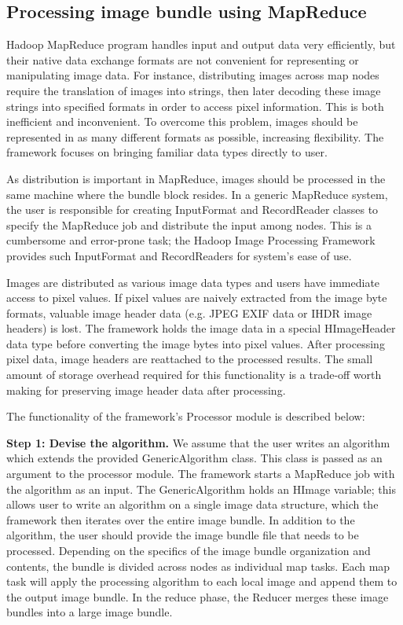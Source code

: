 \documentclass[conference]{IEEEtran}
\begin{document}
\subsection{Processing image bundle using MapReduce}
Hadoop MapReduce program handles input and output data very
efficiently, but their native data exchange formats are not convenient
for representing or manipulating image data.  For instance,
distributing images across map nodes require the translation of images
into strings, then later decoding these image strings into specified
formats in order to access pixel information.  This is both
inefficient and inconvenient. To overcome this problem, images should
be represented in as many different formats as possible, increasing
flexibility. The framework focuses on bringing familiar data types
directly to user.

As distribution is important in MapReduce, images should be processed
in the same machine where the bundle block resides. In a generic
MapReduce system, the user is responsible for creating InputFormat and
RecordReader classes to specify the MapReduce job and distribute the
input among nodes. This is a cumbersome and error-prone task; the
Hadoop Image Processing Framework provides such InputFormat and
RecordReaders for system's ease of use.

Images are distributed as various image data types and users have
immediate access to pixel values.  If pixel values are naively
extracted from the image byte formats, valuable image header data
(e.g. JPEG EXIF data or IHDR \cite{David03} image headers) is
lost. The framework holds the image data in a special HImageHeader
data type before converting the image bytes into pixel values.  After
processing pixel data, image headers are reattached to the processed
results.  The small amount of storage overhead required for this
functionality is a trade-off worth making for preserving
image header data after processing.

The functionality of the framework's Processor module is described
below:

\textbf{Step 1: Devise the algorithm.} We assume that the user writes
an algorithm which extends the provided GenericAlgorithm class. This
class is passed as an argument to the processor module. The framework
starts a MapReduce job with the algorithm as an input. The
GenericAlgorithm holds an HImage variable; this allows user to write
an algorithm on a single image data structure, which the framework
then iterates over the entire image bundle. In addition to the
algorithm, the user should provide the image bundle file that needs to
be processed.  Depending on the specifics of the image bundle
organization and contents, the bundle is divided across nodes as
individual map tasks. Each map task will apply the processing
algorithm to each local image and append them to the output
image bundle. In the reduce phase, the Reducer merges these image
bundles into a large image bundle.
\end{document}
